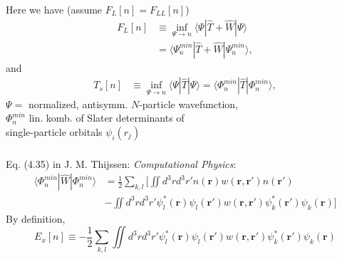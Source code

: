 \documentclass[compress]{beamer}
\newcommand*{\ket}[1]{|#1\rangle}
\newcommand*{\bra}[1]{\langle#1|}
\begin{document}
\frame
{ 
  \frametitle{}
  \begin{small}
    {\scriptsize
      Here we have (assume $F_{L}[n]=F_{LL}[n]$)
      \begin{align}
        F_{L}[n]&\equiv \inf_{\Psi \rightarrow n}\bra{\Psi }\hat{T}+\hat{W}\ket{\Psi } \nonumber \\
        &=\bra{\Psi_{n}^{min}}\hat{T}+\hat{W}\ket{\Psi_{n}^{min}}, \nonumber 
      \end{align}
      and 
      \begin{align}
        T_{s}[n]&\equiv \inf_{\Psi \rightarrow n}\bra{\Psi }\hat{T}\ket{\Psi }=\bra{\Phi_{n}^{min}}\hat{T}\ket{\Phi_{n}^{min}}, \nonumber 
      \end{align}
      $\Psi = $ normalized, antisymm. $N$-particle wavefunction, \\
      $\Phi_{n}^{min}$ lin. komb. of Slater determinants of \\
      single-particle orbitals $\psi_{i}(r_{j})$ 
    }
  \end{small}
}

\frame
{ 
  \frametitle{}
  \begin{small}
    {\scriptsize
      Eq. (4.35) in J. M. Thijssen: \emph{Computational Physics}:
      \begin{align}
        \bra{\Phi_{n}^{min}}\hat{W}\ket{\Phi_{n}^{min}}&=\frac{1}{2}\sum_{k,l}\bigg[ \iint d^{3}r d^{3}r' n(\mathbf{r})w(\mathbf{r},\mathbf{r}')n(\mathbf{r}') \nonumber \\
        &-\iint d^{3}r d^{3}r' \psi_{l}^{*}(\mathbf{r})\psi_{l}(\mathbf{r}')w(\mathbf{r},\mathbf{r}')\psi_{k}^{*}(\mathbf{r}')\psi_{k}(\mathbf{r})\bigg] \nonumber
      \end{align}
      By definition,
      \begin{equation}
        E_{x}[n]\equiv -\frac{1}{2}\sum_{k,l}\iint d^{3}r d^{3}r' \psi_{l}^{*}(\mathbf{r})\psi_{l}(\mathbf{r}')w(\mathbf{r},\mathbf{r}')\psi_{k}^{*}(\mathbf{r}')\psi_{k}(\mathbf{r})  \nonumber
      \end{equation}
    }
  \end{small}
}
\end{document}
